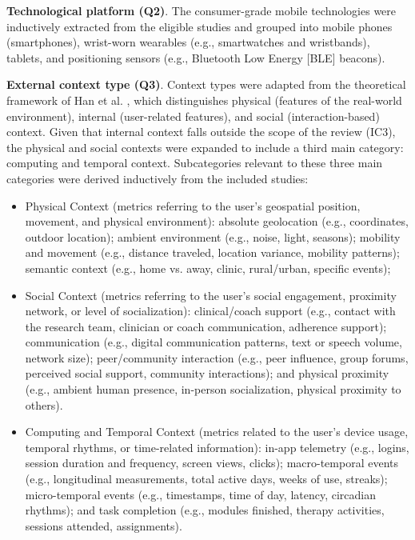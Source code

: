 \textbf{Technological platform (Q2)}. The consumer-grade mobile technologies were inductively extracted from the eligible studies and grouped into mobile phones (smartphones), wrist-worn wearables (e.g., smartwatches and wristbands), tablets, and positioning sensors (e.g., Bluetooth Low Energy [BLE] beacons).

\textbf{External context type (Q3)}. Context types were adapted from the theoretical framework of Han et al. \cite{han2008contextaware}, which distinguishes physical (features of the real-world environment), internal (user-related features), and social (interaction-based) context. Given that internal context falls outside the scope of the review (IC3), the physical and social contexts were expanded to include a third main category: computing and temporal context. Subcategories relevant to these three main categories were derived inductively from the included studies:

\begin{itemize}
    \item Physical Context (metrics referring to the user's geospatial position, movement, and physical environment): absolute geolocation (e.g., coordinates, outdoor location); ambient environment (e.g., noise, light, seasons); mobility and movement (e.g., distance traveled, location variance, mobility patterns); semantic context (e.g., home vs. away, clinic, rural/urban, specific events);
    
    \item Social Context (metrics referring to the user's social engagement, proximity network, or level of socialization): clinical/coach support (e.g., contact with the research team, clinician or coach communication, adherence support); communication (e.g., digital communication patterns, text or speech volume, network size); peer/community interaction (e.g., peer influence, group forums, perceived social support, community interactions); and physical proximity (e.g., ambient human presence, in-person socialization, physical proximity to others).
    
    \item Computing and Temporal Context (metrics related to the user's device usage, temporal rhythms, or time-related information): in-app telemetry (e.g., logins, session duration and frequency, screen views, clicks);
    macro-temporal events (e.g., longitudinal measurements, total active days, weeks of use, streaks); 
    micro-temporal events (e.g., timestamps, time of day, latency, circadian rhythms); and task completion (e.g., modules finished, therapy activities, sessions attended, assignments). 
\end{itemize}    
    
